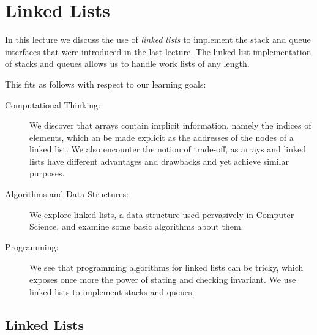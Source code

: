 \chapter{Linked Lists}
\label{ch:linkedlist}

\newcommand{\lecnum}{10}
\newcommand{\lecturer}{Frank Pfenning, Rob Simmons, Andr\'e Platzer,
  Iliano Cervesato}

\maketitle

\begin{preamble}
\noindent
In this lecture we discuss the use of \emph{linked lists} to implement
the stack and queue interfaces that were introduced in the last lecture.  The
linked list implementation of stacks and queues allows us to handle
work lists of any length.
\end{preamble}

\begin{gram}
This fits as follows with respect to our learning goals:
\begin{description}
\item[Computational Thinking: ]%
  We discover that arrays contain implicit information, namely the
  indices of elements, which an be made explicit as the addresses of
  the nodes of a linked list.  We also encounter the notion of
  trade-off, as arrays and linked lists have different advantages and
  drawbacks and yet achieve similar purposes.
\item[Algorithms and Data Structures: ]%
  We explore linked lists, a data structure used pervasively in Computer
  Science, and examine some basic algorithms about them.
\item[Programming: ]%
  We see that programming algorithms for linked lists can be tricky,
  which exposes once more the power of stating and checking invariant.
  We use linked lists to implement stacks and queues.
\end{description}
\end{gram}


\section{Linked Lists}
\label{sec:linkedlist:intro}

